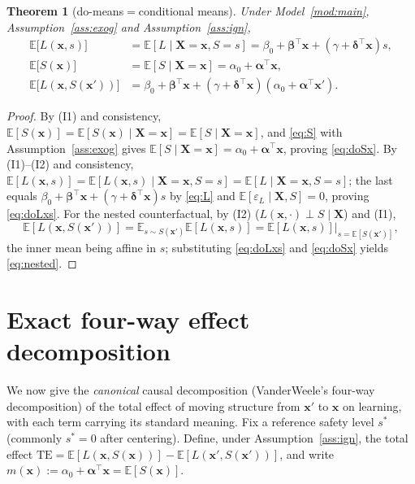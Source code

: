 \documentclass{amsart}
\theoremstyle{definition}
\theoremstyle{plain}
\newtheorem{theorem}{Theorem}
\begin{document}
\begin{theorem}[do-means$=$conditional means]\label{thm:causal}
Under Model~\ref{mod:main}, Assumption~\ref{ass:exog} and Assumption~\ref{ass:ign},
\begin{align}
\mathbb E\big[L(\bm x,s)\big]&=\mathbb E[L\mid \bm X=\bm x,S=s]
   =\beta_0+\bm\beta^\top\bm x+(\gamma+\bm\delta^\top\bm x)s,\label{eq:doLxs}\\
\mathbb E\big[S(\bm x)\big]&=\mathbb E[S\mid \bm X=\bm x]=\alpha_0+\bm\alpha^\top\bm x,
\label{eq:doSx}\\
\mathbb E\big[L(\bm x,S(\bm x'))\big]
  &=\beta_0+\bm\beta^\top\bm x+(\gamma+\bm\delta^\top\bm x)(\alpha_0+\bm\alpha^\top\bm x').
\label{eq:nested}
\end{align}
\end{theorem}

\begin{proof}
By (I1) and consistency, $\mathbb E[S(\bm x)]=\mathbb E[S(\bm x)\mid\bm X=\bm x]
=\mathbb E[S\mid\bm X=\bm x]$, and \eqref{eq:S} with Assumption~\ref{ass:exog} gives
$\mathbb E[S\mid\bm X=\bm x]=\alpha_0+\bm\alpha^\top\bm x$, proving \eqref{eq:doSx}.
By (I1)--(I2) and consistency, $\mathbb E[L(\bm x,s)]=\mathbb E[L(\bm x,s)\mid\bm X=\bm x,
S=s]=\mathbb E[L\mid\bm X=\bm x,S=s]$; the last equals
$\beta_0+\bm\beta^\top\bm x+(\gamma+\bm\delta^\top\bm x)s$ by \eqref{eq:L} and
$\mathbb E[\varepsilon_L\mid\bm X,S]=0$, proving \eqref{eq:doLxs}. For the nested
counterfactual, by (I2) ($L(\bm x,\cdot)\perp S\mid\bm X$) and (I1),
\[
\mathbb E[L(\bm x,S(\bm x'))]
=\mathbb E_{s\sim S(\bm x')}\mathbb E[L(\bm x,s)]
=\mathbb E[L(\bm x,s)]\big|_{s=\mathbb E[S(\bm x')]},
\]
the inner mean being affine in $s$; substituting \eqref{eq:doLxs} and \eqref{eq:doSx}
yields \eqref{eq:nested}.
\end{proof}

\section{Exact four-way effect decomposition}

We now give the \emph{canonical} causal decomposition (VanderWeele's four-way
decomposition) of the total effect of moving structure from $\bm x'$ to $\bm x$ on learning,
with each term carrying its standard meaning. Fix a reference safety level $s^\ast$ (commonly
$s^\ast=0$ after centering). Define, under Assumption~\ref{ass:ign}, the total effect
$\mathrm{TE}=\mathbb E[L(\bm x,S(\bm x))]-\mathbb E[L(\bm x',S(\bm x'))]$, and write
$m(\bm x):=\alpha_0+\bm\alpha^\top\bm x=\mathbb E[S(\bm x)]$.
\end{document}
